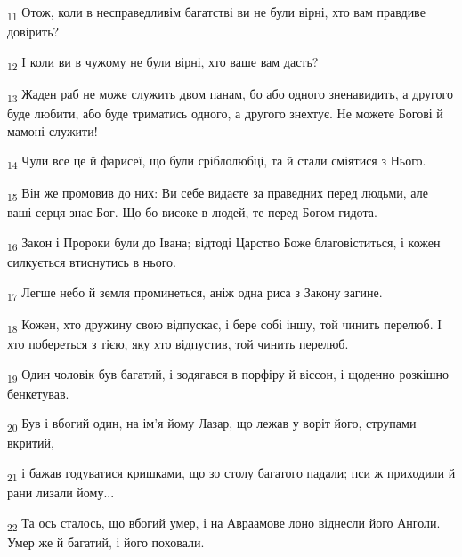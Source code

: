 \begin{tcolorbox}
\textsubscript{11} Отож, коли в несправедливім багатстві ви не були вірні, хто вам правдиве довірить?
\end{tcolorbox}
\begin{tcolorbox}
\textsubscript{12} І коли ви в чужому не були вірні, хто ваше вам дасть?
\end{tcolorbox}
\begin{tcolorbox}
\textsubscript{13} Жаден раб не може служить двом панам, бо або одного зненавидить, а другого буде любити, або буде триматись одного, а другого знехтує. Не можете Богові й мамоні служити!
\end{tcolorbox}
\begin{tcolorbox}
\textsubscript{14} Чули все це й фарисеї, що були сріблолюбці, та й стали сміятися з Нього.
\end{tcolorbox}
\begin{tcolorbox}
\textsubscript{15} Він же промовив до них: Ви себе видаєте за праведних перед людьми, але ваші серця знає Бог. Що бо високе в людей, те перед Богом гидота.
\end{tcolorbox}
\begin{tcolorbox}
\textsubscript{16} Закон і Пророки були до Івана; відтоді Царство Боже благовіститься, і кожен силкується втиснутись в нього.
\end{tcolorbox}
\begin{tcolorbox}
\textsubscript{17} Легше небо й земля проминеться, аніж одна риса з Закону загине.
\end{tcolorbox}
\begin{tcolorbox}
\textsubscript{18} Кожен, хто дружину свою відпускає, і бере собі іншу, той чинить перелюб. І хто побереться з тією, яку хто відпустив, той чинить перелюб.
\end{tcolorbox}
\begin{tcolorbox}
\textsubscript{19} Один чоловік був багатий, і зодягався в порфіру й віссон, і щоденно розкішно бенкетував.
\end{tcolorbox}
\begin{tcolorbox}
\textsubscript{20} Був і вбогий один, на ім'я йому Лазар, що лежав у воріт його, струпами вкритий,
\end{tcolorbox}
\begin{tcolorbox}
\textsubscript{21} і бажав годуватися кришками, що зо столу багатого падали; пси ж приходили й рани лизали йому...
\end{tcolorbox}
\begin{tcolorbox}
\textsubscript{22} Та ось сталось, що вбогий умер, і на Авраамове лоно віднесли його Анголи. Умер же й багатий, і його поховали.
\end{tcolorbox}
